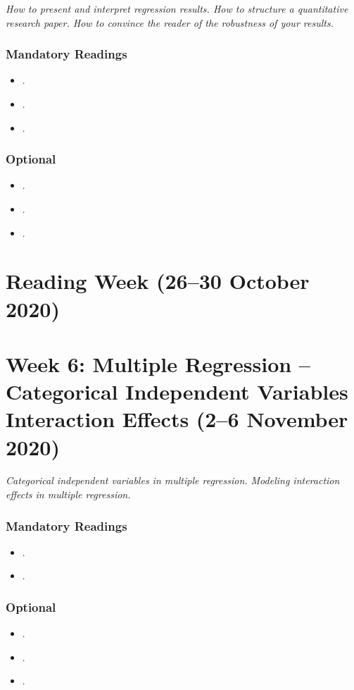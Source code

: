 \documentclass[abstract=on,parskip=full,headings=standardclasses,fontsize=11pt,paper=a4]{scrartcl}
\begin{document}
\textit{How to present and interpret regression results. How to structure a quantitative research paper. How to convince the reader of the robustness of your results.}


\subsubsection*{Mandatory Readings}
\begin{itemize}
\item {}.
\item {}.
\item {}.
\end{itemize}


\subsubsection*{Optional}
\begin{itemize}
\item {}.
\item {}.
\item {}.
\end{itemize}


\section{Reading Week (26--30 October 2020) }


\section{Week 6: Multiple Regression -- Categorical Independent Variables Interaction Effects (2--6 November 2020)}


\textit{Categorical independent variables in multiple regression. Modeling interaction effects in multiple regression.}

\subsubsection*{Mandatory Readings}
\begin{itemize}
\item {}.
\item {}.
\end{itemize}


\subsubsection*{Optional}
\begin{itemize}
\item {}.
\item {}.
\item {}.
\end{itemize}
\end{document}
